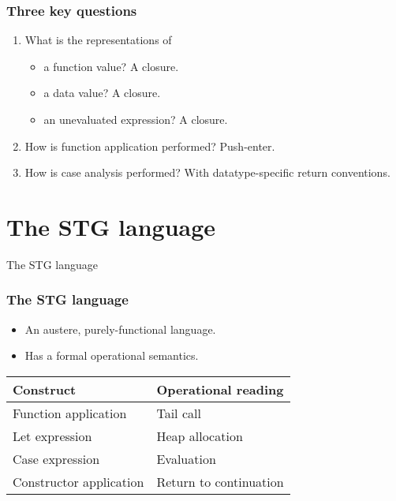 \documentclass{beamer}
\begin{document}
\begin{frame}
    \frametitle{Three key questions}

    \begin{enumerate}
        \item What is the representations of
            \begin{itemize}
                \item a function value? A closure.
                \item a data value? A closure.
                \item an unevaluated expression? A closure.
            \end{itemize}

        \item How is function application performed? Push-enter.

        \item How is case analysis performed? With datatype-specific
            \alert{return conventions}.
    \end{enumerate}
\end{frame}

\section{The STG language}

\begin{frame}
    \Huge{The STG language}
\end{frame}

\begin{frame}
    \frametitle{The STG language}

    \begin{itemize}
        \item An austere, purely-functional language.
        \item Has a formal operational semantics.
    \end{itemize}

    \begin{center}
        \begin{tabular}{|l l|}
            \hline Construct & Operational reading \\ \hline
            Function application & Tail call \\
            Let expression & Heap allocation \\
            Case expression & Evaluation \\
            Constructor application & Return to continuation \\
            \hline
        \end{tabular}
    \end{center}
\end{frame}
\end{document}
